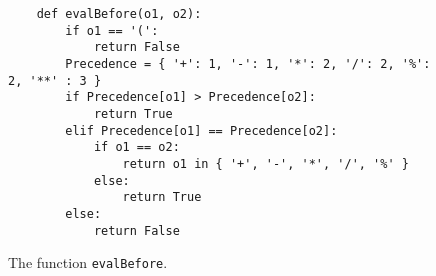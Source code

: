 \begin{figure}[!ht]
\centering
\begin{verbatim}
    def evalBefore(o1, o2):
        if o1 == '(':
            return False
        Precedence = { '+': 1, '-': 1, '*': 2, '/': 2, '%': 2, '**' : 3 }
        if Precedence[o1] > Precedence[o2]:
            return True
        elif Precedence[o1] == Precedence[o2]:
            if o1 == o2:
                return o1 in { '+', '-', '*', '/', '%' }
            else:
                return True
        else:
            return False
\end{verbatim}
\vspace*{-0.3cm}
\caption{The function \texttt{evalBefore}.}
\label{fig:}
\end{figure}


